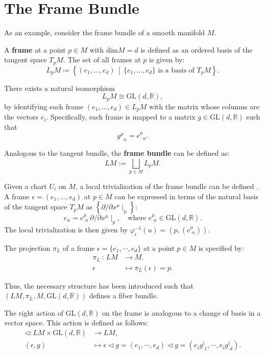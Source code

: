 \section{The Frame Bundle}

As an example, consider the frame bundle of a smooth manifold \( M \).

A \textbf{frame} at a point \( p \in M \) with \(\text{dim} M = d\) is defined as an ordered basis of the tangent space \(T_pM\). The set of all frames at \( p \) is given by:
\[
L_pM \coloneqq \left\{ (e_1, \dots, e_d) \,\middle|\, \{e_1, \dots, e_d\} \text{ is a basis of } T_pM \right\}.
\]

There exists a natural isomorphism
\[
L_pM \cong \mathrm{GL}(d, \mathbb{R}),
\]
by identifying each frame \( (e_1, \dots, e_d) \in L_pM \) with the matrix whose columns are the vectors \( e_i \). Specifically, each frame is mapped to a matrix \( g \in \mathrm{GL}(d, \mathbb{R}) \) such that
\[
g^\mu_{\;\;\alpha} = e^\mu_{\;\;\alpha}.
\]

Analogous to the tangent bundle, the \textbf{frame bundle} can be defined as:
\[ LM := \bigsqcup_{p \in M} L_pM. \]

Given a chart \( U_i \) on \( M \), a local trivialization of the frame bundle can be defined \cite{NakaharaGeometrytopologyphysics2005}. A frame \( \epsilon = (e_1, \dots, e_d) \) at \( p \in M \) can be expressed in terms of the natural basis of the tangent space \( T_pM \) as \( \left\{ \partial / \partial x^\mu \mid_p \right\} \):
\[ e_\alpha = e^\mu_{\,\,\alpha} \, \partial/\partial x^\mu \mid_p, \quad \text{where } e^\mu_{\,\,\alpha} \in \mathrm{GL}(d, \mathbb{R}). \]
The local trivialization is then given by \( \varphi_i^{-1}(u)=(p,(e^\mu_{\,\,\alpha})) \).

The projection \( \pi_L \) of a frame \( \epsilon = \{e_1, \cdots, e_d\} \) at a point \( p \in M \) is specified by:
\begin{align*}
  \pi_L \, : \, LM & \longrightarrow M, \\
        \epsilon & \mapsto \pi_L(\epsilon)=p.
\end{align*}

Thus, the necessary structure has been introduced such that \( (LM, \pi_L, M, \text{GL}(d,\mathbb{R})) \) defines a fiber bundle.

The right action of \( \mathrm{GL}(d,\mathbb{R}) \) on the frame is analogous to a change of basis in a vector space. This action is defined as follows:
\begin{align*}
  \triangleleft : LM \times \mathrm{GL}(d,\mathbb{R}) & \longrightarrow LM, \\
  (\epsilon, g) & \mapsto \epsilon \triangleleft g = (e_1, \cdots, e_d) \triangleleft g = (e_i g^i_{\,\,1}, \cdots, e_i g^i_{\,\,d}).
\end{align*}

